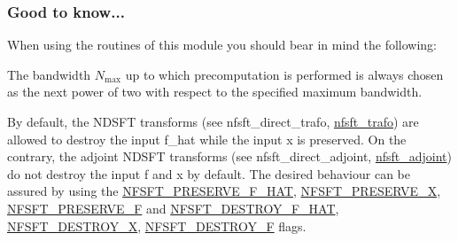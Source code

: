 \hypertarget{group__nfsft_gtn}{}\subsubsection{Good to know...}\label{group__nfsft_gtn}
When using the routines of this module you should bear in mind the following\-: \begin{DoxyItemize}
\item The bandwidth $N_{\text{max}}$ up to which precomputation is performed is always chosen as the next power of two with respect to the specified maximum bandwidth. \item By default, the N\-D\-S\-F\-T transforms (see nfsft\-\_\-direct\-\_\-trafo, \hyperlink{group__nfsft_ga5796fc68c432d46dfcab7abd8c56ee22}{nfsft\-\_\-trafo}) are allowed to destroy the input {\ttfamily f\-\_\-hat} while the input {\ttfamily x} is preserved. On the contrary, the adjoint N\-D\-S\-F\-T transforms (see nfsft\-\_\-direct\-\_\-adjoint, \hyperlink{group__nfsft_ga813bb48d404c7286310733c99a81a169}{nfsft\-\_\-adjoint}) do not destroy the input {\ttfamily f} and {\ttfamily x} by default. The desired behaviour can be assured by using the \hyperlink{group__nfsft_gac8a292845f0bdec6b0d8ef6eb693a00e}{N\-F\-S\-F\-T\-\_\-\-P\-R\-E\-S\-E\-R\-V\-E\-\_\-\-F\-\_\-\-H\-A\-T}, \hyperlink{group__nfsft_gacf7d73753b74dbf148167c3d46226f09}{N\-F\-S\-F\-T\-\_\-\-P\-R\-E\-S\-E\-R\-V\-E\-\_\-\-X}, \hyperlink{group__nfsft_ga45962e763c2c551c1ea764a68b686b5c}{N\-F\-S\-F\-T\-\_\-\-P\-R\-E\-S\-E\-R\-V\-E\-\_\-\-F} and \hyperlink{group__nfsft_gaa808899fc4db422c7b23470e6baad904}{N\-F\-S\-F\-T\-\_\-\-D\-E\-S\-T\-R\-O\-Y\-\_\-\-F\-\_\-\-H\-A\-T}, \hyperlink{group__nfsft_ga6f22df0b292db920d795b3e3569181f2}{N\-F\-S\-F\-T\-\_\-\-D\-E\-S\-T\-R\-O\-Y\-\_\-\-X}, \hyperlink{group__nfsft_ga2b32e2eabd33bf0886f6df45365d04c0}{N\-F\-S\-F\-T\-\_\-\-D\-E\-S\-T\-R\-O\-Y\-\_\-\-F} flags. \end{DoxyItemize}


